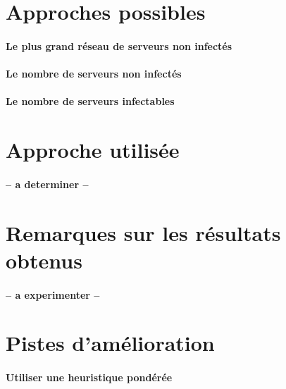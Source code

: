 \documentclass{scrreprt}
\begin{document}
    \section{Approches possibles}

    \paragraph{Le plus grand réseau de serveurs non infectés}

    \paragraph{Le nombre de serveurs non infectés}

    \paragraph{Le nombre de serveurs infectables}

    \section{Approche utilisée}

    \paragraph{-- a determiner --}

    \begin{result}

    \end{result}

    \section{Remarques sur les résultats obtenus}

    \paragraph{-- a experimenter --}

    \section{Pistes d'amélioration}

    \paragraph{Utiliser une heuristique pondérée}
\end{document}
